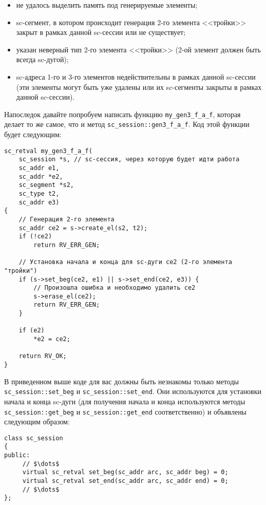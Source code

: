 \begin{itemize}
\item не удалось выделить память под генерируемые элементы;
\item sc-сегмент, в котором происходит генерация 2-го элемента
  <<тройки>> закрыт в рамках данной sc-сессии или не существует;
\item указан неверный тип 2-го элемента <<тройки>> (2-ой элемент
  должен быть всегда sc-дугой);
\item sc-адреса 1-го и 3-го элементов недействительны в рамках данной
  sc-сессии (эти элементы могут быть уже удалены или их sc-сегменты
  закрыты в рамках данной sc-сессии).
\end{itemize}

Напоследок давайте попробуем написать функцию
\lstinline|my_gen3_f_a_f|, которая делает то же самое, что и метод
\lstinline|sc_session::gen3_f_a_f|. Код этой функции будет следующим:

\begin{lstlisting}[texcl]
sc_retval my_gen3_f_a_f(
    sc_session *s, // sc-сессия, через которую будет идти работа
    sc_addr e1,
    sc_addr *e2,
    sc_segment *s2,
    sc_type t2,
    sc_addr e3)
{
    // Генерация 2-го элемента
    sc_addr ce2 = s->create_el(s2, t2);
    if (!ce2)
        return RV_ERR_GEN;

    // Установка начала и конца для sc-дуги ce2 (2-го элемента "тройки")
    if (s->set_beg(ce2, e1) || s->set_end(ce2, e3)) {
        // Произошла ошибка и необходимо удалить ce2
        s->erase_el(ce2);
        return RV_ERR_GEN;
    }

    if (e2)
        *e2 = ce2;

    return RV_OK;
}
\end{lstlisting}

В приведенном выше коде для вас должны быть незнакомы только методы
\lstinline|sc_session::set_beg| и \lstinline|sc_session::set_end|. Они
используются для установки начала и конца sc-дуги (для получения
начала и конца используются методы \lstinline|sc_session::get_beg| и
\lstinline|sc_session::get_end| соответственно) и объявлены следующим
образом:

\begin{lstlisting}[texcl]
class sc_session
{
public:
     // $\dots$
     virtual sc_retval set_beg(sc_addr arc, sc_addr beg) = 0;
     virtual sc_retval set_end(sc_addr arc, sc_addr end) = 0;
     // $\dots$
};
\end{lstlisting}

